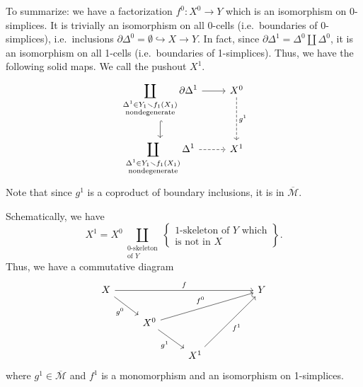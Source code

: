 \documentclass[main.tex]{subfiles}
\begin{document}
\begin{example}
  To summarize: we have a factorization $f^{0}\colon X^{0} \to Y$ which is an isomorphism on 0-simplices. It is trivially an isomorphism on all 0-cells (i.e.\ boundaries of 0-simplices), i.e.\ inclusions $\partial \Delta^{0} = \emptyset \hookrightarrow X \to Y$. In fact, since $\partial \Delta^{1} = \Delta^{0} \amalg \Delta^{0}$, it is an isomorphism on all 1-cells (i.e.\ boundaries of 1-simplices). Thus, we have the following solid maps. We call the pushout $X^{1}$.
  \begin{equation*}
    \begin{tikzcd}
      \displaystyle\coprod_{\substack{\Delta^{1} \in Y_{1} \smallsetminus f_{1}(X_{1}) \\ \text{nondegenerate}}} \partial \Delta^{1}
      \arrow[r]
      \arrow[d, hookrightarrow]
      & X^{0}
      \arrow[d, dashed, "g^{1}"]
      \\
      \displaystyle\coprod_{\substack{\Delta^{1} \in Y_{1} \smallsetminus f_{1}(X_{1}) \\ \text{nondegenerate}}} \Delta^{1}
      \arrow[r, dashed]
      & X^{1}
    \end{tikzcd}
  \end{equation*}
  Note that since $g^{1}$ is a coproduct of boundary inclusions, it is in $\overline{\mathcal{M}}$.

  Schematically, we have
  \begin{equation*}
    X^{1} = X^{0} \coprod_{\substack{\text{0-skeleton} \\ \text{of $Y$}}} \left\{ \substack{\text{1-skeleton of $Y$ which}\\\text{is not in $X$}} \right\}.
  \end{equation*}
  Thus, we have a commutative diagram
  \begin{equation*}
    \begin{tikzcd}
      X
      \arrow[rrrr, "f"]
      \arrow[dr, swap, "g^{0}"]
      &&&& Y
      \\
      & X^{0}
      \arrow[urrr, "f^{0}"]
      \arrow[dr, swap, "g^{1}"]
      \\
      && X^{1}
      \arrow[uurr, swap, "f^{1}"]
    \end{tikzcd}
  \end{equation*}
  where $g^{1} \in \overline{\mathcal{M}}$ and $f^{1}$ is a monomorphism and an isomorphism on 1-simplices.


\end{example}
\end{document}
